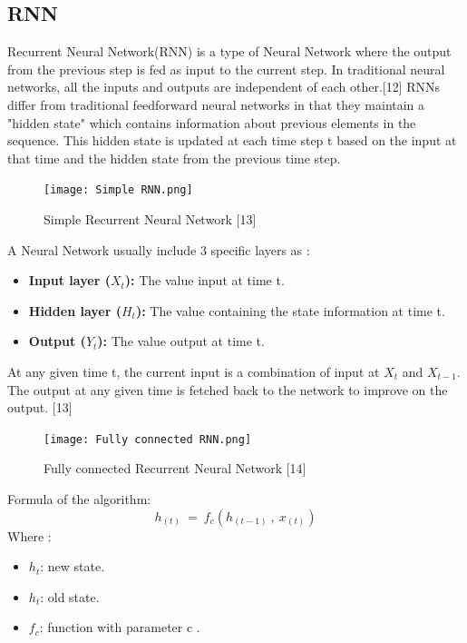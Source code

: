 \documentclass{ieeeojies}
\begin{document}
\subsection{RNN}
Recurrent Neural Network(RNN) is a type of Neural Network where the output from the previous step is fed as input to the current step. In traditional neural networks, all the inputs and outputs are independent of each other.[12] RNNs differ from traditional feedforward neural networks in that they maintain a "hidden state" which contains information about previous elements in the sequence. This hidden state is updated at each time step t based on the input at that time and the hidden state from the previous time step.
\begin{figure}[H]
    \centering
    \begin{minipage}{0.23\textwidth}
    \centering
    \texttt{[image: Simple RNN.png]}
    \caption{Simple Recurrent Neural Network [13]}
    \label{fig:1}
    \end{minipage}
\end{figure}
A Neural Network usually include 3 specific layers as :
\begin{itemize}
    \item \textbf{Input layer (\(X_t\)): } The value input at time t.
\end{itemize}
\begin{itemize}
    \item \textbf{Hidden layer (\(H_t\)):  } The value containing the state information at time t.
\end{itemize}
\begin{itemize}
    \item \textbf{Output (\(Y_t\)):  } The value output at time t.
\end{itemize}

At any given time t, the current input is a combination of input at \(X_t\) and \(X_{t-1}\). The output at any given time is fetched back to the network to improve on the output. [13]


 \begin{figure}[H]
    \centering
    \begin{minipage}{0.50\textwidth}
    \centering
    \texttt{[image: Fully connected RNN.png]}
    \caption{Fully connected Recurrent Neural Network [14]}
    \label{fig:1}
    \end{minipage}
\end{figure}
Formula of the algorithm:
\[h_{(t)}\ =\ f_c(h_{(t-1)}\ ,\ x_{(t)})\]
Where : 
\begin{itemize}
    \item 	\(h_t\): new state.
\end{itemize}
\begin{itemize}
     \item \(h_t\): old state.
 \end{itemize}
 \begin{itemize}
     \item \(f_c\): function with parameter c .
 \end{itemize}
\end{document}
